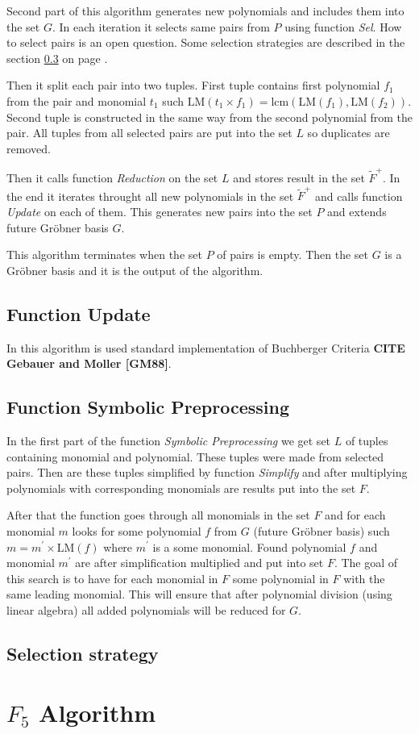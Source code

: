 Second part of this algorithm generates new polynomials and includes them into the set $G$. In each iteration it selects same pairs from $P$ using function \textit{Sel}. How to select pairs is an open question. Some selection strategies are described in the section \ref{subsec:F4:sel} on page \pageref{subsec:F4:sel}.

Then it split each pair into two tuples. First tuple contains first polynomial $f_1$ from the pair and monomial $t_1$ such $\textrm{LM}(t_1 \times f_1) = \textrm{lcm}(\textrm{LM}(f_1),\textrm{LM}(f_2))$. Second tuple is constructed in the same way from the second polynomial from the pair. All tuples from all selected pairs are put into the set $L$ so duplicates are removed.

Then it calls function \textit{Reduction} on the set $L$ and stores result in the set $\tilde{F}^+$. In the end it iterates throught all new polynomials in the set $\tilde{F}^+$ and calls function \textit{Update} on each of them. This generates new pairs into the set $P$ and extends future Gr\"obner basis $G$.

This algorithm terminates when the set $P$ of pairs is empty. Then the set $G$ is a Gr\"obner basis and it is the output of the algorithm.

\subsection{Function Update}
In this algorithm is used standard implementation of Buchberger Criteria \textbf{CITE Gebauer and Moller [GM88]}.

\subsection{Function Symbolic Preprocessing}
In the first part of the function \textit{Symbolic Preprocessing} we get set $L$ of tuples containing monomial and polynomial. These tuples were made from selected pairs. Then are these tuples simplified by function \textit{Simplify} and after multiplying polynomials with corresponding monomials are results put into the set $F$.

After that the function goes through all monomials in the set $F$ and for each monomial $m$ looks for some polynomial $f$ from $G$ (future Gr\"obner basis) such $m = m^\prime \times \textrm{LM}(f)$ where $m^\prime$ is a some monomial. Found polynomial $f$ and monomial $m^\prime$ are after simplification multiplied and put into set $F$. The goal of this search is to have for each monomial in $F$ some polynomial in $F$ with the same leading monomial. This will ensure that after polynomial division (using linear algebra) all added polynomials will be reduced for $G$.

\subsection{Selection strategy}
\label{subsec:F4:sel}

\section{$F_5$ Algorithm}

